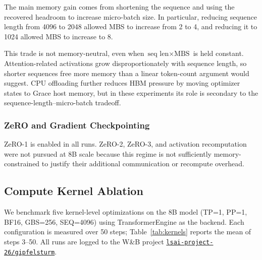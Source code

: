 \documentclass[10pt,twocolumn,letterpaper]{article}
\begin{document}
The main memory gain comes from shortening the sequence and using the recovered headroom
to increase micro-batch size. In particular, reducing sequence length from 4096 to 2048
allowed MBS to increase from 2 to 4, and reducing it to 1024 allowed MBS to increase to 8.

This trade is not memory-neutral, even when $\text{seq len} \times \text{MBS}$ is held
constant. Attention-related activations grow disproportionately with sequence length, so
shorter sequences free more memory than a linear token-count argument would suggest.
CPU offloading further reduces HBM pressure by moving optimizer states to Grace host
memory, but in these experiments its role is secondary to the sequence-length--micro-batch tradeoff.

\subsubsection{ZeRO and Gradient Checkpointing}

ZeRO-1 is enabled in all runs. ZeRO-2, ZeRO-3, and activation recomputation were not
pursued at 8B scale because this regime is not sufficiently memory-constrained to justify
their additional communication or recompute overhead.
\subsection{Compute Kernel Ablation}
\label{sec:kernels}

We benchmark five kernel-level optimizations on the 8B model (TP=1, PP=1, BF16, GBS=256, SEQ=4096) using TransformerEngine as the backend. Each configuration is measured over 50 steps; Table~\ref{tab:kernels} reports the mean of steps 3--50. All runs are logged to the W\&B project \href{https://wandb.ai/lsai-project-26/gipfelsturm}{\texttt{lsai-project-26/gipfelsturm}}.
\end{document}
